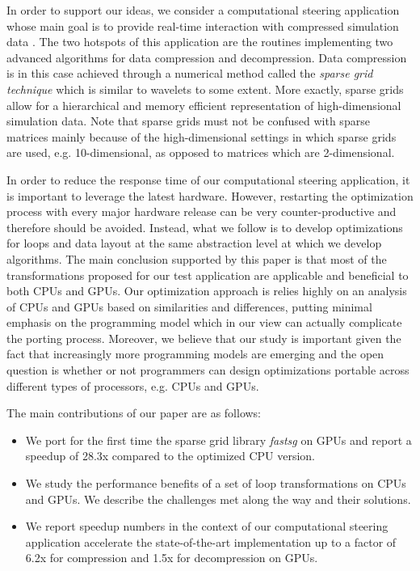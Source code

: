 In order to support our ideas, we consider a computational steering application
whose main goal is to provide real-time interaction with compressed simulation
data \cite{Butnaru201156}. The two hotspots of this application are the routines
implementing two advanced algorithms for data compression and decompression.
Data compression is in this case achieved through a numerical method called
the \textit{sparse grid technique} which is similar to wavelets to some extent.
More exactly, sparse grids allow for a hierarchical and memory efficient
representation of high-dimensional simulation data. Note that sparse grids must
not be confused with sparse matrices mainly because of the high-dimensional
settings in which sparse grids are used, e.g. 10-dimensional, as opposed to
matrices which are 2-dimensional.

In order to reduce the response time of our computational steering application,
it is important to leverage the latest hardware. However, restarting the
optimization process with every major hardware release can be very
counter-productive and therefore should be avoided. Instead, what we follow is
to develop optimizations for loops and data layout at the same abstraction level
at which we develop algorithms. The main conclusion supported by this paper is
that most of the transformations proposed for our test application are
applicable and beneficial to both CPUs and GPUs. Our optimization approach is
relies highly on an analysis of CPUs and GPUs based on similarities and
differences, putting minimal emphasis on the programming model which in our view
can actually complicate the porting process. Moreover, we believe that our study
is important given the fact that increasingly more programming models are
emerging and the open question is whether or not programmers can design
optimizations portable across different types of processors, e.g. CPUs and GPUs.

The main contributions of our paper are as follows:

\begin{itemize}
  \item We port for the first time the sparse grid library \textit{fastsg} on
  GPUs and report a speedup of 28.3x compared to the optimized CPU version.
  \item We study the performance benefits of a set of loop transformations on
  CPUs and GPUs. We describe the challenges met along the way and their
  solutions.
  \item We report speedup numbers in the context of our computational steering
  application accelerate the state-of-the-art implementation up to a factor of
  6.2x for compression and 1.5x for decompression on GPUs.
\end{itemize}

